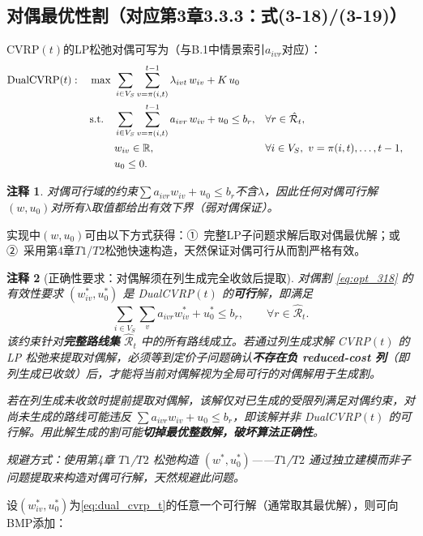 \documentclass{article}
\newtheorem{remark}{注释}
\begin{document}
\subsection{对偶最优性割（对应第3章3.3.3：式(3-18)/(3-19)）}

CVRP$(t)$的LP松弛对偶可写为（与B.1中情景索引$a_{ivr}$对应）：
\begin{align}
\text{DualCVRP}(t):\quad
\max\ & \sum_{i\in V_S}\sum_{v=\pi(i,t)}^{t-1} \lambda_{ivt}\,w_{iv} + K\,u_0 \notag\\
\text{s.t.}\quad
& \sum_{i\in V_S}\sum_{v=\pi(i,t)}^{t-1} a_{ivr}\,w_{iv} + u_0 \le b_r, && \forall r\in\hat{\mathcal R}_t, \notag\\
& w_{iv}\in\mathbb R, && \forall i\in V_S,\ v=\pi(i,t),\dots,t-1, \notag\\
& u_0\le 0 .
\label{eq:dual_cvrp_t}
\end{align}

\begin{remark}
对偶可行域的约束$\sum a_{ivr}w_{iv}+u_0\le b_r$不含$\lambda$，因此任何对偶可行解$(w,u_0)$对所有$\lambda$取值都给出有效下界（弱对偶保证）。
\end{remark}

实现中$(w,u_0)$可由以下方式获得：①~完整LP子问题求解后取对偶最优解；或②~采用第4章$T1$/$T2$松弛快速构造，天然保证对偶可行从而割严格有效。

\begin{remark}[正确性要求：对偶解须在列生成完全收敛后提取]
对偶割 \eqref{eq:opt_318} 的有效性要求 $(w_{iv}^*,u_0^*)$ 是 DualCVRP$(t)$ 的\textbf{可行}解，即满足
\[
\sum_{i\in V_S}\sum_{v}a_{ivr}w_{iv}^*+u_0^*\le b_r,\qquad \forall r\in\hat{\mathcal R}_t.
\]
该约束针对\textbf{完整路线集} $\hat{\mathcal R}_t$ 中的所有路线成立。若通过列生成求解 CVRP$(t)$ 的 LP 松弛来提取对偶解，必须等到定价子问题确认\textbf{不存在负 reduced-cost 列}（即列生成已收敛）后，才能将当前对偶解视为全局可行的对偶解用于生成割。

若在列生成未收敛时提前提取对偶解，该解仅对已生成的受限列满足对偶约束，对尚未生成的路线可能违反 $\sum a_{ivr}w_{iv}+u_0\le b_r$，即该解并非 DualCVRP$(t)$ 的可行解。用此解生成的割可能\textbf{切掉最优整数解，破坏算法正确性}。

规避方式：使用第4章 $T1$/$T2$ 松弛构造 $(w^*,u_0^*)$——$T1$/$T2$ 通过独立建模而非子问题提取来构造对偶可行解，天然规避此问题。
\end{remark}

设$(w_{iv}^*,u_0^*)$为\eqref{eq:dual_cvrp_t}的任意一个可行解（通常取其最优解），则可向BMP添加：
\end{document}
